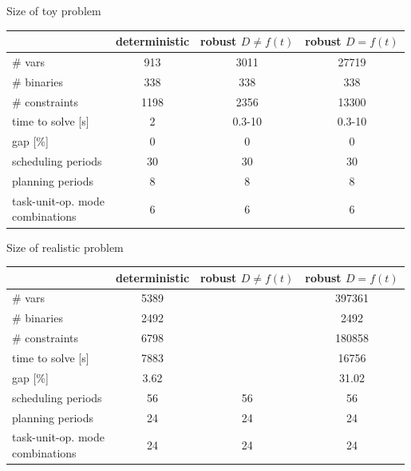 \documentclass[slides]{beamer}
\begin{document}
\begin{frame}{Size of toy problem}
\centering
\begin{tabular}{|l|c|c|c|} \hline
     & deterministic & robust $D \neq f(t)$ & robust $D = f(t)$ \\ \hline
    \# vars & 913 & 3011 & 27719\\
    \# binaries & 338 & 338 & 338\\
    \# constraints & 1198 & 2356 & 13300\\ \hline
    time to solve [s] & 2 & 0.3-10 & 0.3-10\\
    gap [\%] & 0 & 0 & 0 \\ \hline
    scheduling periods & 30 & 30 & 30\\
    planning periods & 8 & 8 & 8\\
    \makecell[l]{task-unit-op. mode\\ combinations} & 6 & 6 & 6\\\hline

\end{tabular}
\end{frame}

\begin{frame}{Size of realistic problem}
\centering
\begin{tabular}{|l|c|c|c|} \hline
    & deterministic & robust $D \neq f(t)$ & robust $D = f(t)$ \\ \hline
    \# vars & 5389 &  & 397361\\
    \# binaries & 2492 &  & 2492\\
    \# constraints & 6798 & & 180858\\ \hline
    time to solve [s] & 7883 &  & 16756\\
    gap [\%] & 3.62 &  & 31.02\\ \hline
    scheduling periods & 56 & 56 & 56\\
    planning periods & 24 & 24 & 24\\
    \makecell[l]{task-unit-op. mode\\ combinations} & 24 & 24 & 24\\ \hline

\end{tabular}
\end{frame}
\end{document}
